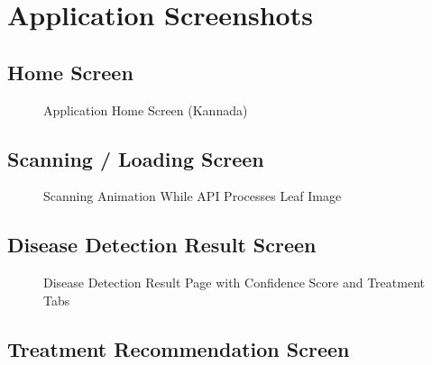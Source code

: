 \documentclass[12pt,a4paper]{report}
\begin{document}
\section{Application Screenshots}

\subsection{Home Screen}

\begin{figure}[h!]
\centering
\caption{Application Home Screen (Kannada)}
\label{fig:home_screen}
\end{figure}

\subsection{Scanning / Loading Screen}

\begin{figure}[h!]
\centering
\caption{Scanning Animation While API Processes Leaf Image}
\label{fig:scanning_screen}
\end{figure}

\subsection{Disease Detection Result Screen}

\begin{figure}[h!]
\centering
\caption{Disease Detection Result Page with Confidence Score and Treatment Tabs}
\label{fig:result_screen}
\end{figure}

\subsection{Treatment Recommendation Screen}
\end{document}
